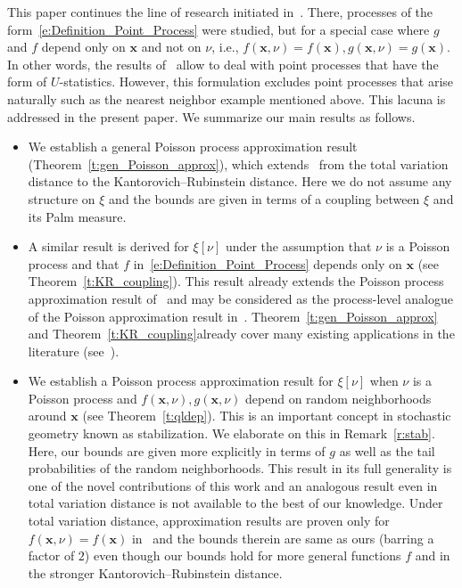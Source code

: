 \documentclass[AHL,Unicode,longabstracts]{cedram}
\newcommand{\bx}{\mathbf{x}}
\begin{document}
This paper continues the line of research initiated in~\cite{decreusefond_functional_2016}. There, processes of the form~\eqref{e:Definition_Point_Process} were studied, but for a special case where $g$ and $f$ depend only on $\bx$ and not on $\nu$, i.e., $f(\bx,\nu) = f(\bx), g(\bx,\nu) = g(\bx)$. In other words, the results of~\cite{decreusefond_functional_2016} allow to deal with point processes that have the form of $U$-statistics. However, this formulation excludes point processes that arise naturally such as the nearest neighbor example mentioned above. This lacuna is addressed in the present paper. We summarize our main results as follows.
\begin{itemize}
\item We establish a general Poisson process approximation result (Theorem~\ref{t:gen_Poisson_approx}), which extends~\cite[Theorem~2.6]{Barbour1992} from the total variation distance to the Kantorovich--Rubinstein distance. Here we do not assume any structure on $\xi$ and the bounds are given in terms of a coupling between $\xi$ and its Palm measure.

\item A similar result is derived for $\xi[\nu]$ under the assumption that $\nu$ is a Poisson process and that $f$ in~\eqref{e:Definition_Point_Process} depends only on $\bx$ (see Theorem~\ref{t:KR_coupling}). This result already extends the Poisson process approximation result of~\cite[Theorem~3.1]{decreusefond_functional_2016} and may be considered as the process-level analogue of the Poisson approximation result in~\cite[Theorem~3.1]{penrose_inhomogeneous_2018}. Theorem~\ref{t:gen_Poisson_approx} and Theorem~\ref{t:KR_coupling}\linebreak already cover many existing applications in the literature (see~\cite{decreusefond_functional_2016,Otto2020}).

\item We establish a Poisson process approximation result for $\xi[\nu]$ when $\nu$ is a Poisson process and $f(\bx,\nu), g(\bx,\nu)$ depend on random neighborhoods around $\bx$ (see Theorem~\ref{t:qldep}). This is an important concept in stochastic geometry known as stabilization. We elaborate on this in Remark~\ref{r:stab}. Here, our bounds are given more explicitly in terms of $g$ as well as the tail probabilities of the random neighborhoods. This result in its full generality is one of the novel contributions of this work and an analogous result even in total variation distance is not available to the best of our knowledge. Under total variation distance, approximation results are proven only for $f(\bx,\nu) = f(\bx)$ in~\cite[Theorem~3.3]{Otto2020} and the bounds therein are same as ours (barring a factor of $2$) even though our bounds hold for more general functions $f$ and in the stronger Kantorovich--Rubinstein distance.


\end{itemize}
\end{document}
